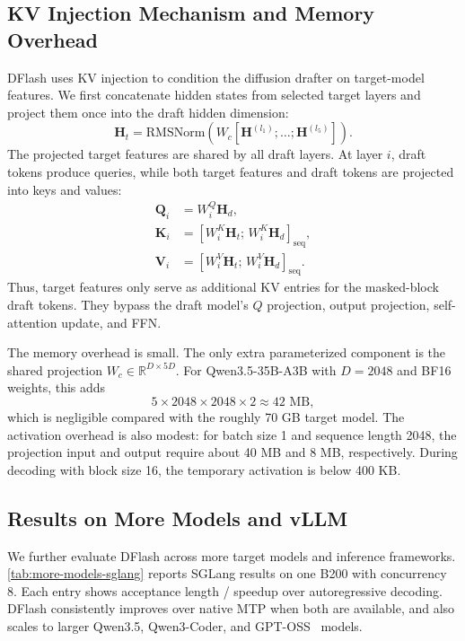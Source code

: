 \subsection{KV Injection Mechanism and Memory Overhead}
\label{appd:kv-injection}

DFlash uses KV injection to condition the diffusion drafter on target-model features. We first concatenate hidden states from selected target layers and project them once into the draft hidden dimension:
\[
\mathbf{H}_{t}
=
\mathrm{RMSNorm}
\left(
W_c[\mathbf{H}^{(l_1)};\ldots;\mathbf{H}^{(l_5)}]
\right).
\]
The projected target features are shared by all draft layers. At layer $i$, draft tokens produce queries, while both target features and draft tokens are projected into keys and values:
\[
\begin{aligned}
\mathbf{Q}_i &= W_i^Q \mathbf{H}_d, \\
\mathbf{K}_i &= [W_i^K \mathbf{H}_t;\, W_i^K \mathbf{H}_d]_{\mathrm{seq}}, \\
\mathbf{V}_i &= [W_i^V \mathbf{H}_t;\, W_i^V \mathbf{H}_d]_{\mathrm{seq}}.
\end{aligned}
\]
Thus, target features only serve as additional KV entries for the masked-block draft tokens. They bypass the draft model's $Q$ projection, output projection, self-attention update, and FFN.

The memory overhead is small. The only extra parameterized component is the shared projection $W_c \in \mathbb{R}^{D \times 5D}$. For Qwen3.5-35B-A3B with $D=2048$ and BF16 weights, this adds
\[
5 \times 2048 \times 2048 \times 2 \approx 42\text{ MB},
\]
which is negligible compared with the roughly 70 GB target model. The activation overhead is also modest: for batch size 1 and sequence length 2048, the projection input and output require about 40 MB and 8 MB, respectively. During decoding with block size 16, the temporary activation is below 400 KB.

\subsection{Results on More Models and vLLM}
\label{appd:more-models-vllm}

We further evaluate DFlash across more target models and inference frameworks. 
\autoref{tab:more-models-sglang} reports SGLang results on one B200 with concurrency 8. 
Each entry shows acceptance length / speedup over autoregressive decoding. 
DFlash consistently improves over native MTP when both are available, and also scales to larger Qwen3.5, Qwen3-Coder, and GPT-OSS~\citep{agarwal2025gpt} models.

